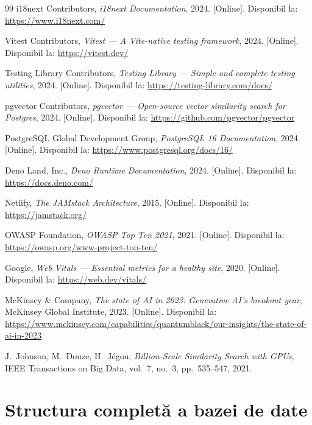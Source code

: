 \documentclass[12pt,a4paper,oneside]{report}
\begin{document}
\begin{thebibliography}{99}
i18next Contributors, \textit{i18next Documentation}, 2024. [Online]. Disponibil la: \url{https://www.i18next.com/}

Vitest Contributors, \textit{Vitest — A Vite-native testing framework}, 2024. [Online]. Disponibil la: \url{https://vitest.dev/}

Testing Library Contributors, \textit{Testing Library — Simple and complete testing utilities}, 2024. [Online]. Disponibil la: \url{https://testing-library.com/docs/}

pgvector Contributors, \textit{pgvector — Open-source vector similarity search for Postgres}, 2024. [Online]. Disponibil la: \url{https://github.com/pgvector/pgvector}

PostgreSQL Global Development Group, \textit{PostgreSQL 16 Documentation}, 2024. [Online]. Disponibil la: \url{https://www.postgresql.org/docs/16/}

Deno Land, Inc., \textit{Deno Runtime Documentation}, 2024. [Online]. Disponibil la: \url{https://docs.deno.com/}

Netlify, \textit{The JAMstack Architecture}, 2015. [Online]. Disponibil la: \url{https://jamstack.org/}

OWASP Foundation, \textit{OWASP Top Ten 2021}, 2021. [Online]. Disponibil la: \url{https://owasp.org/www-project-top-ten/}

Google, \textit{Web Vitals — Essential metrics for a healthy site}, 2020. [Online]. Disponibil la: \url{https://web.dev/vitals/}

McKinsey \& Company, \textit{The state of AI in 2023: Generative AI's breakout year}, McKinsey Global Institute, 2023. [Online]. Disponibil la: \url{https://www.mckinsey.com/capabilities/quantumblack/our-insights/the-state-of-ai-in-2023}

J.~Johnson, M.~Douze, H.~Jégou, \textit{Billion-Scale Similarity Search with GPUs}, IEEE Transactions on Big Data, vol.~7, no.~3, pp.~535--547, 2021.

\end{thebibliography}


\appendix

\chapter{Structura completă a bazei de date}
\end{document}
